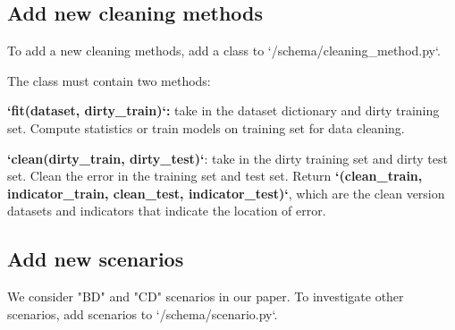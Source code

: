 \subsection*{Add new cleaning methods}
\begin{flushleft}
	To add a new cleaning methods, add a class to `/schema/cleaning\_method.py`.

The class must contain two methods:
\end{flushleft}

\textbf{`fit(dataset, dirty\_train)`:} take in the dataset dictionary and dirty training set. Compute statistics or train models on training set for data cleaning.

\textbf{`clean(dirty\_train, dirty\_test)`}: take in the dirty training set and dirty test set. Clean the error in the training set and test set. Return \textbf{`(clean\_train, indicator\_train, clean\_test, indicator\_test)`}, which are the clean version datasets and indicators that indicate the location of error. 

\subsection*{Add new scenarios}
We consider "BD" and "CD" scenarios in our paper. To investigate other scenarios, add scenarios to `/schema/scenario.py`.


